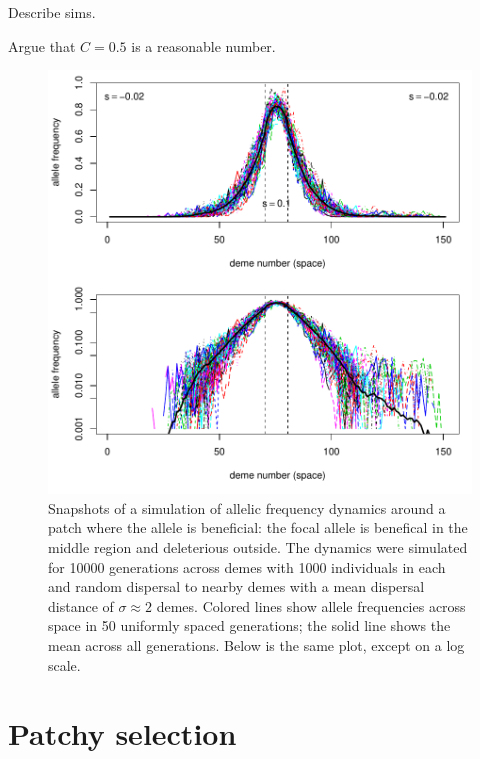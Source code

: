 \documentclass{article}
\begin{document}
Describe sims.

Argue that $C=0.5$ is a reasonable number.

\begin{figure}[ht!]
    \begin{center}
        \includegraphics{example-equilibrium}
    \end{center}
    \label{fig:example_equil}
    \caption{
    Snapshots of a simulation of allelic frequency dynamics around a patch where the allele is beneficial:
    the focal allele is benefical in the middle region and deleterious outside.
    The dynamics were simulated for 10000 generations across demes with 1000 individuals in each
    and random dispersal to nearby demes with a mean dispersal distance of $\sigma \approx 2$ demes.
    Colored lines show allele frequencies across space in 50 uniformly spaced generations;
    the solid line shows the mean across all generations.
    Below is the same plot, except on a log scale.
    }
\end{figure}



\section{Patchy selection} 
\label{ss:discretedemes}
\end{document}
